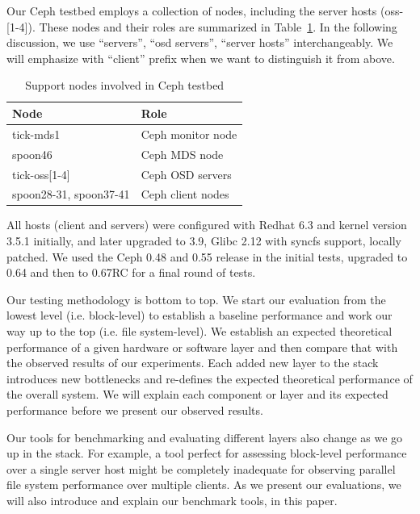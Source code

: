 Our Ceph testbed employs a collection of nodes, including the server hosts
(oss-[1-4]). These nodes and their roles are summarized in
Table~\ref{tbl:ceph-test-nodes}. In the following discussion, we use
``servers'', ``osd servers'', ``server hosts'' interchangeably. We will
emphasize with ``client'' prefix when we want to distinguish it from above.

\begin{table}[!t]
\centering
\caption{Support nodes involved in Ceph testbed}
\label{tbl:ceph-test-nodes}
    \begin{tabular}{ll}
    \hline
    Node & Role \\
    \hline
    tick-mds1 & Ceph monitor node \\
    spoon46 & Ceph MDS node \\
    tick-oss[1-4] & Ceph OSD servers \\
    spoon28-31, spoon37-41 & Ceph client nodes \\
    \hline
    \end{tabular}
\end{table}

All hosts  (client and servers) were configured with Redhat 6.3 and kernel
version 3.5.1 initially, and later upgraded to 3.9, Glibc
2.12 with syncfs support, locally patched.  We used the Ceph 0.48 and 0.55
release in the initial tests, upgraded to 0.64 and then to 0.67RC for a final
round of tests.




Our testing methodology is bottom to top. We start our evaluation from the
lowest level (i.e. block-level)  to establish a baseline performance and work
our way up to the top (i.e. file system-level). We establish an expected
theoretical performance of a given hardware or software layer and then compare
that with the observed results of our experiments. Each added new layer to the
stack introduces new bottlenecks and re-defines the expected theoretical
performance of the overall system. We will explain each component or layer and
its expected performance before we present our observed results.

Our tools for benchmarking and evaluating different layers also change as we go
up in the stack.  For example, a tool perfect for assessing block-level
performance over a single server host might be completely inadequate for
observing parallel file system performance over multiple clients. As we present
our evaluations, we will also introduce and explain our benchmark tools, in
this paper.
